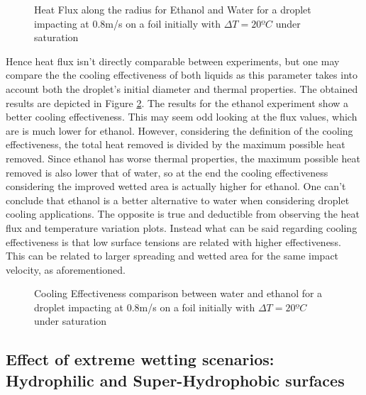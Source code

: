 \begin{figure}[h]
\centering
\subfigure[2 ms]{}
\subfigure[4 ms]{}
\caption{Heat Flux along the radius for Ethanol and Water for a droplet impacting at 0.8m/s on a foil initially with $\Delta T=20ºC$ under saturation}
\label{fig:ethflux}
\end{figure}

\par Hence heat flux isn't directly comparable between experiments, but one may compare the the cooling effectiveness of both liquids as this parameter takes into account both the droplet's initial diameter and thermal properties. The obtained results are depicted in Figure \ref{fig:ethcool}. The results for the ethanol experiment show a better cooling effectiveness. This may seem odd looking at the flux values, which are is much lower for ethanol. However, considering the definition of the cooling effectiveness, the total heat removed is divided by the maximum possible heat removed. Since ethanol has worse thermal properties, the maximum possible heat removed is also lower that of water, so at the end the cooling effectiveness considering the improved wetted area is actually higher for ethanol. One can't conclude that ethanol is a better alternative to water when considering droplet cooling applications. The opposite is true and deductible from observing the heat flux and temperature variation plots. Instead what can be said regarding cooling effectiveness is that low surface tensions are related with higher effectiveness. This can be related to larger spreading and wetted area for the same impact velocity, as aforementioned.

\begin{figure}[h]
\centering

\caption{Cooling Effectiveness comparison between water and ethanol for a droplet impacting at 0.8m/s on a foil initially with $\Delta T=20ºC$ under saturation}
\label{fig:ethcool}
\end{figure}

\subsection{Effect of extreme wetting scenarios: Hydrophilic and Super-Hydrophobic surfaces}

